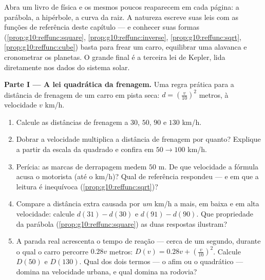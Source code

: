 \begin{problem}
\label{pb:g10:reffunc:1}
Abra um livro de física e os mesmos poucos  reaparecem em
cada página: a parábola, a hipérbole, a curva da raiz. A natureza
escreve suas leis com as funções de referência deste capítulo ---
e conhecer suas formas (\cref{prop:g10:reffunc:square},
\cref{prop:g10:reffunc:inverse}, \cref{prop:g10:reffunc:sqrt},
\cref{prop:g10:reffunc:cube}) basta para frear um carro,
equilibrar uma alavanca e cronometrar os planetas. O grande final
é a terceira lei de Kepler, lida diretamente nos dados do sistema
solar.

\medskip
\noindent\textbf{Parte I --- A lei quadrática da frenagem.}
Uma regra prática para a distância de frenagem de um carro em
pista seca: $d = \left(\frac{v}{10}\right)^{2}$ metros, à
velocidade $v$ km/h.
\begin{enumerate}
  \item Calcule as distâncias de frenagem a $30$, $50$, $90$ e
        $130$ km/h.
  \item Dobrar a velocidade multiplica a distância de frenagem
        por quanto? Explique a partir da escala da 
        quadrado e confira em $50 \to 100$ km/h.
  \item Perícia: as marcas de derrapagem medem $50$ m. De que
        velocidade a fórmula acusa o motorista (até o km/h)? Qual
         de referência respondeu --- e em que  a
        leitura é inequívoca
        (\cref{prop:g10:reffunc:sqrt})?
  \item Compare a distância extra causada por \emph{um} km/h a
        mais, em baixa e em alta velocidade: calcule
        $d(31) - d(30)$ e $d(91) - d(90)$. Que propriedade da
        parábola (\cref{prop:g10:reffunc:square}) as duas
        respostas ilustram?
  \item A parada real acrescenta o tempo de reação --- cerca de
        um segundo, durante o qual o carro percorre $0.28v$
        metros: $D(v) = 0.28v + \left(\frac{v}{10}\right)^2$.
        Calcule $D(50)$ e $D(130)$. Qual dos dois termos --- o
        afim ou o quadrático --- domina na velocidade urbana, e
        qual domina na rodovia?
\end{enumerate}


\end{problem}

